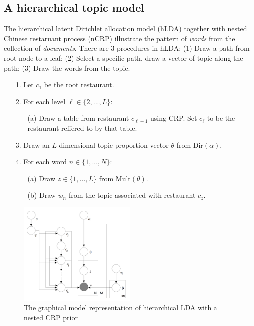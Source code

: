 \documentclass[a4paper]{article}
\begin{document}
\subsection{A hierarchical topic model}

The hierarchical latent Dirichlet allocation model (hLDA) together with nested Chinese restaruant process (nCRP) illustrate the pattern of {\it words} from the collection of {\it documents}. There are 3 procedures in hLDA: (1) Draw a path from root-node to a leaf; (2) Select a specific path, draw a vector of topic along the path; (3) Draw the words from the topic.

\begin{itemize}
\setlength{\itemsep}{0pt}
\setlength{\parsep}{0pt}
\setlength{\parskip}{0pt}
\item [1.] Let $c_{1}$ be the root restaurant.
\item [2.] For each level $\ell\in\{2,...,L\}$:
	\begin{itemize}
	\item [(a)] Draw a table from restaurant $c_{\ell-1}$ using CRP. Set $c_{\ell}$ to be the restaurant reffered to by that table.
	\end{itemize}
\item [3.] Draw an $L$-dimensional topic proportion vector $\theta$ from Dir$(\alpha)$.
\item [4.] For each word $n\in\{1,...,N\}$:
	\begin{itemize}
	\item [(a)] Draw $z\in\{1,...,L\}$ from Mult$(\theta)$.
	\item [(b)] Draw $w_{n}$ from the topic associated with restaurant $c_{z}$.
	\end{itemize}
\end{itemize}

\begin{figure}
\center
\includegraphics[width=0.5\textwidth]{hLDA.png}
\caption{ The graphical model representation of hierarchical LDA with a
nested CRP prior}
\label{fig:mesh1}
\end{figure}
\end{document}
